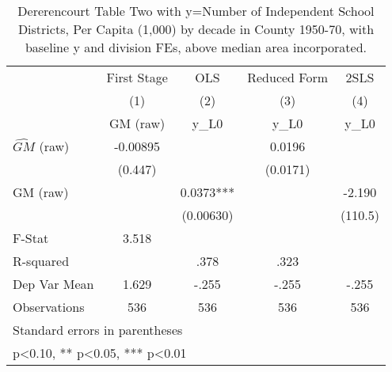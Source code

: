 \begin{table}[htbp]\centering
\def\sym#1{\ifmmode^{#1}\else\(^{#1}\)\fi}
\caption{Dererencourt Table Two with y=Number of Independent School Districts, Per Capita (1,000) by decade in County 1950-70, with baseline y and division FEs, above median area incorporated.}
\begin{tabular}{l*{4}{c}}
\toprule
                    & First Stage   &         OLS   &Reduced Form   &        2SLS   \\
                    &\multicolumn{1}{c}{(1)}&\multicolumn{1}{c}{(2)}&\multicolumn{1}{c}{(3)}&\multicolumn{1}{c}{(4)}\\
                    &\multicolumn{1}{c}{GM  (raw)}&\multicolumn{1}{c}{y\_L0}&\multicolumn{1}{c}{y\_L0}&\multicolumn{1}{c}{y\_L0}\\
\midrule
$\hat{GM}$ (raw)    &    -0.00895   &               &      0.0196   &               \\
                    &     (0.447)   &               &    (0.0171)   &               \\
\addlinespace
GM  (raw)           &               &      0.0373***&               &      -2.190   \\
                    &               &   (0.00630)   &               &     (110.5)   \\
\midrule
F-Stat              &       3.518   &               &               &               \\
R-squared           &               &        .378   &        .323   &               \\
Dep Var Mean        &       1.629   &       -.255   &       -.255   &       -.255   \\
Observations        &         536   &         536   &         536   &         536   \\
\bottomrule
\multicolumn{5}{l}{\footnotesize Standard errors in parentheses}\\
\multicolumn{5}{l}{\footnotesize * p<0.10, ** p<0.05, *** p<0.01}\\
\end{tabular}
\end{table}
